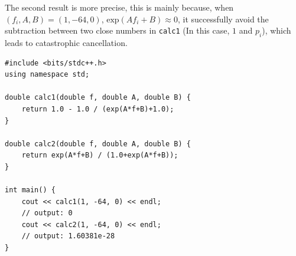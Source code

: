 \documentclass[12pt]{article}
\begin{document}
The second result is more precise, this is mainly because, when $(f_i,A,B)=(1,-64,0)$, $\mathrm{exp}(Af_i+B)\approx 0$, it successfully avoid the subtraction between two close numbers in \texttt{calc1} (In this case, $1$ and $p_i$), which leads to catastrophic cancellation.

\begin{verbatim}
#include <bits/stdc++.h>
using namespace std;

double calc1(double f, double A, double B) {
    return 1.0 - 1.0 / (exp(A*f+B)+1.0);
}

double calc2(double f, double A, double B) {
    return exp(A*f+B) / (1.0+exp(A*f+B));
}

int main() {
    cout << calc1(1, -64, 0) << endl;
    // output: 0
    cout << calc2(1, -64, 0) << endl;
    // output: 1.60381e-28
} 
\end{verbatim}
\end{document}
